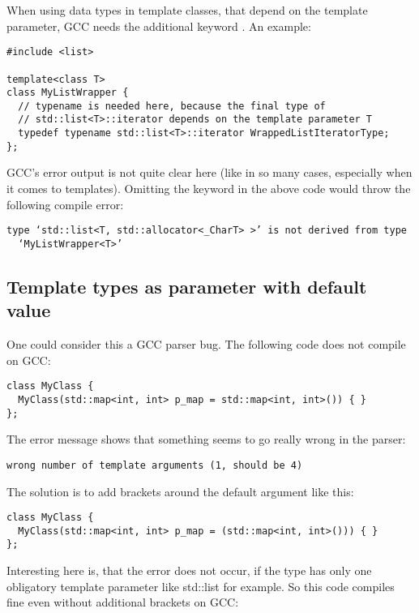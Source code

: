 When using data types in template classes, that depend on the template parameter, GCC needs the additional keyword . An example:

\begin{verbatim}
#include <list>

template<class T>
class MyListWrapper {
  // typename is needed here, because the final type of 
  // std::list<T>::iterator depends on the template parameter T
  typedef typename std::list<T>::iterator WrappedListIteratorType;
};
\end{verbatim}

GCC's error output is not quite clear here (like in so many cases, especially when it comes to templates). Omitting the keyword  in the above code would throw the following compile error:

\begin{verbatim}
type ‘std::list<T, std::allocator<_CharT> >’ is not derived from type 
  ‘MyListWrapper<T>’
\end{verbatim}

\subsection{Template types as parameter with default value}

One could consider this a GCC parser bug. The following code does not compile on GCC:

\begin{verbatim}
class MyClass {
  MyClass(std::map<int, int> p_map = std::map<int, int>()) { }
};
\end{verbatim}

The error message shows that something seems to go really wrong in the parser:

\begin{verbatim}
wrong number of template arguments (1, should be 4)
\end{verbatim}

The solution is to add brackets around the default argument like this:

\begin{verbatim}
class MyClass {
  MyClass(std::map<int, int> p_map = (std::map<int, int>())) { }
};
\end{verbatim}

Interesting here is, that the error does not occur, if the type has only one obligatory template parameter like std::list for example. So this code compiles fine even without additional brackets on GCC:

